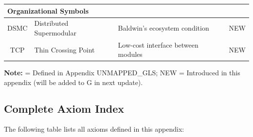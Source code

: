 \begin{longtable}{@{}clp{6cm}c@{}}
\multicolumn{4}{l}{\textbf{Organizational Symbols}} \\
\midrule
DSMC & Distributed Supermodular & Baldwin's ecosystem condition & NEW \\
TCP & Thin Crossing Point & Low-cost interface between modules & NEW \\

\end{longtable}

\textbf{Note:} \checkmark = Defined in Appendix UNMAPPED_GLS; NEW = Introduced in this appendix 
(will be added to G in next update).



\subsection{Complete Axiom Index}
\label{sec:B-axiom-index}

The following table lists all axioms defined in this appendix:

